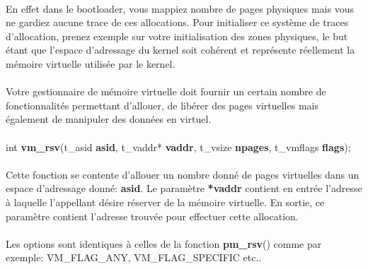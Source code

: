 \documentclass[10pt,a4wide]{article}
\begin{document}
\paragraph{}

En effet dans le bootloader, vous mappiez nombre de pages physiques
mais vous ne gardiez aucune trace de ces allocations. Pour initialiser
ce syst\`eme de traces d'allocation, prenez exemple sur votre
initialisation des zones physiques, le but \'etant que l'espace
d'adressage du kernel soit coh\'erent et repr\'esente r\'eellement
la m\'emoire virtuelle utilis\'ee par le kernel.

\paragraph{}

Votre gestionnaire de m\'emoire virtuelle doit fournir un certain nombre
de fonctionnalit\'es permettant d'allouer, de lib\'erer des pages
virtuelles mais \'egalement de manipuler des donn\'ees en virtuel.

\paragraph{}

\hspace{1.5cm}int \textbf{vm\_rsv}(t\_asid \textbf{asid},
                                   t\_vaddr* \textbf{vaddr},
                                   t\_vsize \textbf{npages},
                                   t\_vmflags \textbf{flags});

\paragraph{}

Cette fonction se contente d'allouer un nombre donn\'e de pages virtuelles
dans un espace d'adressage donn\'e: \textbf{asid}. Le param\`etre
\textbf{*vaddr} contient en entr\'ee l'adresse \`a laquelle l'appellant
d\'esire r\'eserver de la m\'emoire virtuelle. En sortie, ce param\`etre
contient l'adresse trouv\'ee pour effectuer cette allocation.

\paragraph{}

Les options sont identiques \`a celles de la fonction \textbf{pm\_rsv}()
comme par exemple: VM\_FLAG\_ANY, VM\_FLAG\_SPECIFIC etc..
\end{document}
